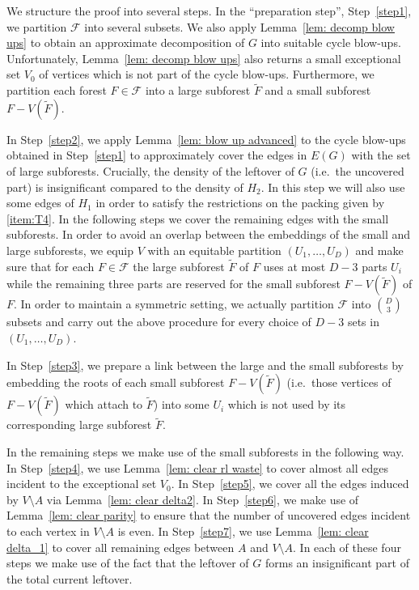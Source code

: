 \documentclass[a4paper, 11pt, reqno]{amsart}
\numberwithin{equation}{section}
\newcommand{\1}{{\rm 1\hspace*{-0.4ex}%
\rule{0.1ex}{1.52ex}\hspace*{0.2ex}}}
\newcommand{\cF}{\mathcal{F}}
\newcommand{\sm}{\setminus}
\newcounter{step}
\begin{document}
We structure the proof into several steps.
In the ``preparation step'', Step~\ref{step1}, 
we partition $\cF$ into several subsets. 
We also apply Lemma~\ref{lem: decomp blow ups} to obtain an approximate decomposition of $G$ into suitable cycle blow-ups.
Unfortunately, Lemma~\ref{lem: decomp blow ups} also returns a small exceptional set $V_0$ of vertices which is not part of the cycle blow-ups.
Furthermore,
we partition each forest $F\in \cF$ into a large subforest $\tilde{F}$ and a small subforest $F-V(\tilde{F})$.

In Step~\ref{step2}, 
we apply Lemma~\ref{lem: blow up advanced} to the cycle blow-ups obtained in Step~\ref{step1} 
to approximately cover the edges in $E(G)$ with the set of large subforests. 
Crucially, the density of the leftover of $G$ (i.e.~the uncovered part) is insignificant compared to the density of $H_2$.
In this step we will also use some edges of $H_1$ in order to satisfy the restrictions on the packing given by \ref{item:T4}.
In the following steps we cover the remaining edges with the small subforests.
In order to avoid an overlap between the embeddings of the small and large subforests, 
we equip $V$ with an equitable partition $(U_1,\ldots,U_D)$ and make sure that for each $F\in \cF$ the large subforest $\tilde{F}$ of $F$ uses at most $D-3$ parts $U_i$
while the remaining three parts are reserved for the small subforest $F-V(\tilde{F})$ of $F$.
In order to maintain a symmetric setting, 
we actually partition $\cF$ into $\binom{D}{3}$ subsets and carry out the above procedure for every choice of $D-3$ sets in $(U_1,\ldots,U_D)$.

In Step~\ref{step3},
we prepare a link between the large and the small subforests by embedding the roots of each small subforest $F-V(\tilde{F})$ 
(i.e.~those vertices of $F-V(\tilde{F})$ which attach to $\tilde{F}$) into some $U_i$ 
which is not used by its corresponding large subforest $\tilde{F}$.

In the remaining steps we make use of the small subforests in the  following way.
In Step~\ref{step4}, we use Lemma~\ref{lem: clear rl waste} to cover almost all edges incident to the exceptional set $V_0$.
In Step~\ref{step5},
we cover all the edges induced by $V\sm A$ via Lemma~\ref{lem: clear delta2}.
In Step~\ref{step6}, we make use of Lemma~\ref{lem: clear parity} to ensure that the number of uncovered edges incident to each vertex in $V\sm A$ is even.
In Step~\ref{step7}, we use Lemma~\ref{lem: clear delta_1} to cover all remaining edges between $A$ and $V\sm A$. In each of these four steps we make use of the fact that the leftover of $G$ forms an insignificant part of the total current leftover.
\end{document}
